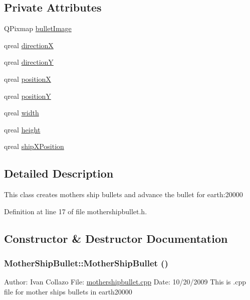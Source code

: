\subsection*{Private Attributes}
\begin{DoxyCompactItemize}
\item 
QPixmap \hyperlink{class_mother_ship_bullet_a9c582124220ad9aa63f7dbbf690a0743}{bulletImage}
\item 
qreal \hyperlink{class_mother_ship_bullet_a7595f4bddbfe83bb5467adc3d06b24a7}{directionX}
\item 
qreal \hyperlink{class_mother_ship_bullet_a886c10db617ba9341d34487514ffd79f}{directionY}
\item 
qreal \hyperlink{class_mother_ship_bullet_a5a9173af31257e18fa08bcb1b30afe11}{positionX}
\item 
qreal \hyperlink{class_mother_ship_bullet_ac20e2e77d3cbac30f2189495fbdce88d}{positionY}
\item 
qreal \hyperlink{class_mother_ship_bullet_ab81cbaea7101d4c9f8ac0c0fbba5fe8a}{width}
\item 
qreal \hyperlink{class_mother_ship_bullet_a76e8ce486a76094373b5afacfc754b8a}{height}
\item 
qreal \hyperlink{class_mother_ship_bullet_af8b80672b755f96fa75b0eb4786fc1a0}{shipXPosition}
\end{DoxyCompactItemize}


\subsection{Detailed Description}
This class creates mothers ship bullets and advance the bullet for earth:20000 

Definition at line 17 of file mothershipbullet.h.

\subsection{Constructor \& Destructor Documentation}
\hypertarget{class_mother_ship_bullet_a95e5f5a708ca1ce2f609c7119eab8c4e}{
\subsubsection[{MotherShipBullet}]{\setlength{\rightskip}{0pt plus 5cm}MotherShipBullet::MotherShipBullet ()}}
\label{class_mother_ship_bullet_a95e5f5a708ca1ce2f609c7119eab8c4e}
Author: Ivan Collazo File: \hyperlink{mothershipbullet_8cpp}{mothershipbullet.cpp} Date: 10/20/2009 This is .cpp file for mother ships bullets in earth20000

